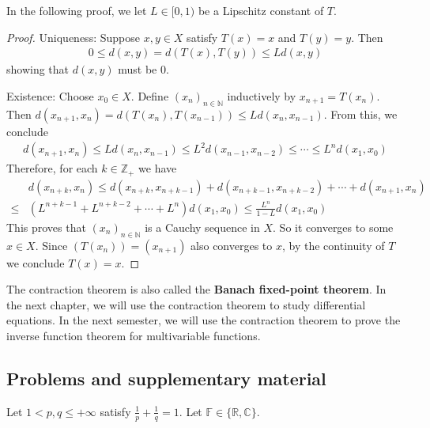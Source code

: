 \documentclass[12pt,b5paper,notitlepage]{article}
\theoremstyle{definition}
\theoremstyle{plain}
\newcommand{\Cbb}{\mathbb C}
\newcommand{\Nbb}{\mathbb N}
\newcommand{\Zbb}{\mathbb Z}
\newcommand{\Rbb}{\mathbb R}
\newcommand{\Fbb}{\mathbb F}
\numberwithin{equation}{section}
\begin{document}
In the following proof, we let $L\in[0,1)$ be a Lipschitz constant of $T$.

\begin{proof}
Uniqueness: Suppose $x,y\in X$ satisfy $T(x)=x$ and $T(y)=y$. Then
\begin{align*}
0\leq d(x,y)=d(T(x),T(y))\leq Ld(x,y)
\end{align*}
showing that $d(x,y)$ must be $0$.

Existence: Choose $x_0\in X$. Define $(x_n)_{n\in\Nbb}$ inductively by $x_{n+1}=T(x_n)$. Then $d(x_{n+1},x_n)=d(T(x_n),T(x_{n-1}))\leq L d(x_n,x_{n-1})$. From this, we conclude
\begin{align*}
d(x_{n+1},x_n)\leq Ld(x_n,x_{n-1})\leq L^2 d(x_{n-1},x_{n-2})\leq\cdots\leq L^n d(x_1,x_0)
\end{align*}
Therefore, for each $k\in\Zbb_+$ we have
\begin{align*}
&d(x_{n+k},x_n)\leq d(x_{n+k},x_{n+k-1})+d(x_{n+k-1},x_{n+k-2})+\cdots+d(x_{n+1},x_n)\\
\leq& (L^{n+k-1}+L^{n+k-2}+\cdots+L^n)d(x_1,x_0)\leq \frac {L^n}{1-L}d(x_1,x_0)
\end{align*}
This proves that $(x_n)_{n\in\Nbb}$ is a Cauchy sequence in $X$. So it converges to some $x\in X$. Since $(T(x_n))=(x_{n+1})$ also converges to $x$, by the continuity of $T$ we conclude $T(x)=x$.
\end{proof}


The contraction theorem is also called the \textbf{Banach fixed-point theorem}. In the next chapter, we will use the contraction theorem to study differential equations. In the next semester, we will use the contraction theorem to prove the inverse function theorem for multivariable functions.












\subsection{Problems and supplementary material}


Let $1<p,q\leq +\infty$ satisfy $\frac 1p+\frac 1q=1$. %
Let $\Fbb\in\{\Rbb,\Cbb\}$. 
\end{document}
